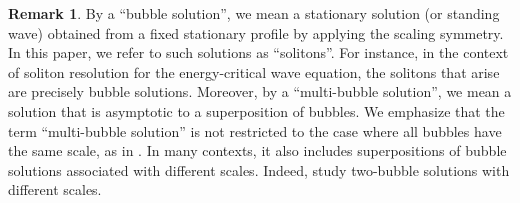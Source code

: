 \documentclass[reqno]{amsart}
\theoremstyle{plain}
\theoremstyle{definition}
\newtheorem{remark}{Remark}[section]
\numberwithin{equation}{section}
\newcommand{\1}{\mathbbm{1}}
\begin{document}
\begin{remark}
By a ``bubble solution'', we mean a stationary solution (or standing wave) obtained from a fixed stationary profile by applying the scaling symmetry. In this paper, we refer to such solutions as ``solitons''. For instance, in the context of soliton resolution for the energy-critical wave equation, the solitons that arise are precisely bubble solutions. Moreover, by a ``multi-bubble solution'', we mean a solution that is asymptotic to a superposition of bubbles. We emphasize that the term ``multi-bubble solution'' is not restricted to the case where all bubbles have the same scale, as in \cite{MR}. In many contexts, it also includes superpositions of bubble solutions associated with different scales. Indeed, \cite{J1,J2,JK,JL1,JL2} study two-bubble solutions with different scales.
\end{remark}
\end{document}
